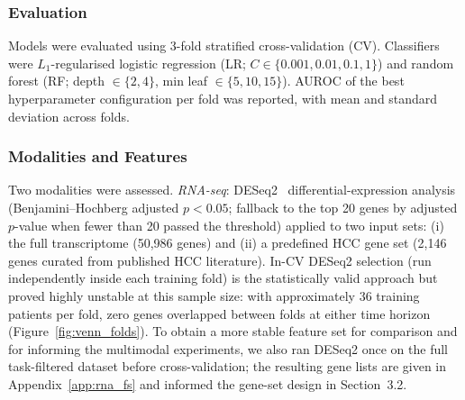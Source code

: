 \documentclass[12pt,twoside]{report}
\begin{document}
\subsubsection*{Evaluation}

Models were evaluated using 3-fold stratified cross-validation (CV).
Classifiers were $L_1$-regularised logistic regression
(LR; $C \in \{0.001, 0.01, 0.1, 1\}$) and random forest
(RF; depth $\in \{2, 4\}$, min leaf $\in \{5, 10, 15\}$). AUROC of the best hyperparameter configuration per fold was reported, with mean and standard deviation across folds.

\subsubsection*{Modalities and Features}

Two modalities were assessed.
\textit{RNA-seq}: DESeq2~\cite{love2014deseq2} differential-expression analysis
(Benjamini--Hochberg adjusted $p < 0.05$; fallback to the top 20 genes by adjusted $p$-value
when fewer than 20 passed the threshold) applied to two input sets:
(i) the full transcriptome (50,986 genes) and
(ii) a predefined HCC gene set (2,146 genes curated from published HCC literature). In-CV DESeq2 selection (run independently inside each training fold) is the statistically valid
approach but proved highly unstable at this sample size: with approximately 36 training patients
per fold, zero genes overlapped between folds at either time horizon (Figure~\ref{fig:venn_folds}).
To obtain a more stable feature set for comparison and for informing the multimodal experiments,
we also ran DESeq2 once on the full task-filtered dataset before cross-validation;
the resulting gene lists are given in Appendix~\ref{app:rna_fs} and informed the gene-set design in Section~3.2.
\end{document}
